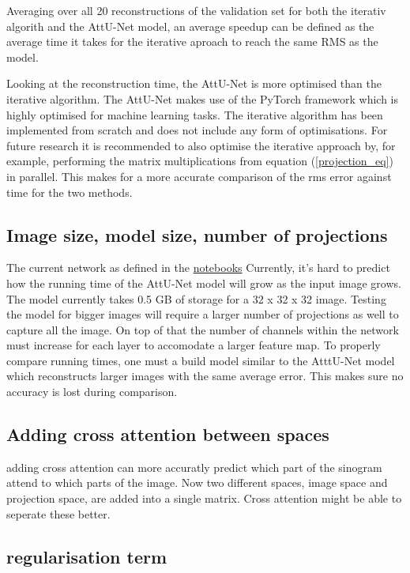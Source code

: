 \documentclass{article}
\begin{document}
Averaging over all 20 reconstructions of the validation set for both the iterativ algorith and the AttU-Net model, an average speedup can be defined as the average time it takes for the iterative aproach to reach the same RMS as the model.

Looking at the reconstruction time, the AttU-Net is more optimised than the iterative algorithm. The AttU-Net makes use of the PyTorch framework which is highly optimised for machine learning tasks. The iterative algorithm has been implemented from scratch and does not include any form of optimisations. For future research it is recommended to also optimise the iterative approach by, for example, performing the matrix multiplications from equation (\ref{projection_eq}) in parallel. This makes for a more accurate comparison of the rms error against time for the two methods.

\subsection{Image size, model size, number of projections}

The current network as defined in the \href{\#}{notebooks}
Currently, it's hard to predict how the running time of the AttU-Net model will grow as the input image grows. The model currently takes 0.5 GB of storage for a 32 x 32 x 32 image. Testing the model for bigger images will require a larger number of projections as well to capture all the image. On top of that the number of channels within the network must increase for each layer to accomodate a larger feature map. To properly compare running times, one must a build model similar to the AtttU-Net model which reconstructs larger images with the same average error. This makes sure no accuracy is lost during comparison.

\subsection{Adding cross attention between spaces}

adding cross attention can more accuratly predict which part of the sinogram attend to which parts of the image. Now two different spaces, image space and projection space, are added into a single matrix. Cross attention might be able to seperate these better.

\subsection{regularisation term}
\end{document}
